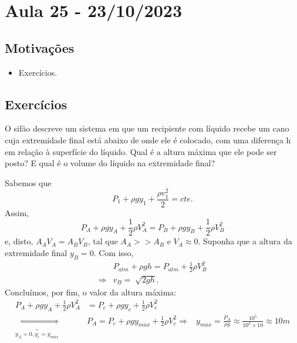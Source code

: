 \documentclass[PhysicsII/phsyicsII_notes.tex]{subfiles}
\begin{document}
\section{Aula 25 - 23/10/2023}
\subsection{Motivações}
\begin{itemize}
	\item Exercícios.
\end{itemize}
\subsection{Exercícios}
\begin{example}
	O sifão descreve um sistema em que um recipiente com líquido recebe um cano cuja extremidade final está abaixo de onde ele é colocado, com uma diferença h
	em relação à superfície do líquido. Qual é a altura máxima que ele pode ser posto? E qual é o volume do líquido na extremidade final?

	Sabemos que
	\[
		P_{1} + \rho gy_{1} + \frac{\rho v_{1}^{2}}{2} = cte.
	\]
	Assim,
	\[
		P_{A} + \rho gy_{A} + \frac{1}{2}\rho V_{A}^{2} = P_{B} + \rho gy_{B} + \frac{1}{2}\rho V_{B}^{2}
	\]
	e, disto, \(A_{A}V_{A} = A_{B}V_{B}\), tal que \(A_{A} >> A_{B}\) e \(V_{A}\approx 0\). Suponha que a altura da extremidade final \(y_{B} = 0\). Com isso,
	\begin{align*}
		            & P_{atm} + \rho gh = P_{atm} + \frac{1}{2}\rho V_{B}^{2} \\
		\Rightarrow & v_{B} = \sqrt[]{2gh}.
	\end{align*}
	Concluímos, por fim, o valor da altura máxima:
	\begin{align*}
		P_{A} + \rho gy_{A} + \frac{1}{2}\rho V_{A}^{2}     & = P_{c} + \rho gy_{c} + \frac{1}{2}\rho V_{c}^{2}                                 \\
		\underbrace{\Rightarrow}_{y_{A}=0, y_{c} = y_{max}} & P_{A} = P_{c} + \rho gy_{max} + \frac{1}{2}\rho V_{c}^{2}
		\Rightarrow                                         & y_{max} = \frac{P_{A}}{\rho g} \approx \frac{10^{5}}{10^{3}\times 10} \approx 10m
	\end{align*}
\end{example}
\end{document}
